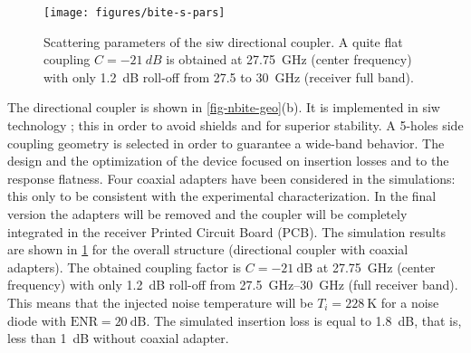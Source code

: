 \documentclass[conference,10pt,a4paper]{IEEEtran}%
\begin{document}
\begin{figure}[t]
	\centering
	\texttt{[image: figures/bite-s-pars]}
	\caption{
		Scattering parameters of the \acrshort{siw} directional coupler.
		A quite flat coupling $C=\SI{-21}{dB}$ is obtained at \SI{27.75}{GHz} (center frequency) with only \SI{1.2}{dB} roll-off from \num{27.5} to \SI{30}{GHz} (receiver full band).
	}
	\label{fig-nbite-res}
\end{figure}
The directional coupler is shown in \cref{fig-nbite-geo}(b).
It is implemented in \ac{siw} technology \cite{Doghri2015}; this in order to avoid shields and for superior stability.
A 5-holes side coupling geometry is selected in order to guarantee a wide-band behavior.
The design and the optimization of the device focused on insertion losses and to the response flatness.
Four coaxial adapters have been considered in the simulations: this only to be consistent with the experimental characterization.
In the final version the adapters will be removed and the coupler will be completely integrated in the receiver Printed Circuit Board (PCB).
The simulation results are shown in \cref{fig-nbite-res} for the overall structure (directional coupler with coaxial adapters).
The obtained coupling factor is $C=\SI{-21}{\dB}$ at \SI{27.75}{\GHz} (center frequency) with only \SI{1.2}{\dB} roll-off from \SIrange{27.5}{30}{\GHz} (full receiver band).
This means that the injected noise temperature will be $T_i=\SI{228}{\kelvin}$ for a noise diode with $\text{ENR}=\SI{20}{\dB}$.
The simulated insertion loss is equal to \SI{1.8}{\dB}, that is, less than \SI{1}{\dB} without coaxial adapter.
\end{document}
